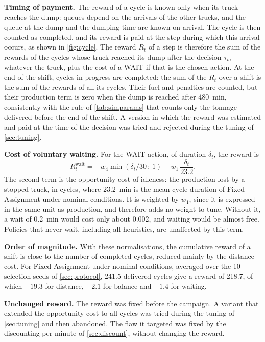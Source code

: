 \documentclass[11pt,a4paper]{article}
\newif\ifrevmarks
\newcommand{\revtag}[1]{\ifrevmarks\textsuperscript{\textcolor{red!70!black}{\scriptsize[#1]}}\fi}
\newenvironment{revbloc}[1]{\par\ifrevmarks\color{revcolor}\noindent\revtag{#1}\ \fi}{\par}
\newif\ifcorrmarks
\newcommand{\corr}[1]{\ifcorrmarks\textcolor{corrcolor}{#1}\else#1\fi}
\begin{document}
\begin{revbloc}{M10, M16, v3}
\textbf{Timing of payment.} \corr{The reward of a cycle is known only when its truck reaches the dump: queues depend on the arrivals of the other trucks, and the queue at the dump and the dumping time are known on arrival. The cycle is then counted as completed, and its reward is paid at the step during which this arrival occurs, as shown in \cref{fig:cycle}. The reward $R_t$ of a step is therefore the sum of the rewards of the cycles whose truck reached its dump after the decision $\tau_t$,} whatever the truck, plus the cost of a WAIT if that is the chosen action. At the end of the shift, cycles in progress are completed: the sum of the $R_t$ over a shift is the sum of the rewards of all its cycles. \corr{Their fuel and penalties are counted, but their production term is zero when the dump is reached after 480~min, consistently with the rule of \cref{tab:simparams} that counts only the tonnage delivered before the end of the shift.} A version in which the reward was estimated and paid at the time of the decision was tried and rejected during the tuning of \cref{sec:tuning}.

\textbf{Cost of voluntary waiting.} For the WAIT action, of duration $\delta_t$, the reward is
\begin{equation}
R^{\mathrm{wait}}_t = - w_4 \min(\delta_t/30\,;\,1) - w_1\, \frac{\delta_t}{23.2} .
\label{eq:wait-reward}
\end{equation}
The second term is the opportunity cost of idleness: the production lost by a stopped truck, in cycles, where 23.2~min is the mean cycle duration of Fixed Assignment under nominal conditions. It is weighted by $w_1$, since it is expressed in the same unit as production, and therefore adds no weight to tune. Without it, a wait of 0.2~min would cost only about 0.002, and waiting would be almost free. Policies that never wait, including all heuristics, are unaffected by this term.

\textbf{Order of magnitude.} With these normalisations, the cumulative reward of a shift is close to the number of completed cycles, reduced mainly by the distance cost. For Fixed Assignment under nominal conditions, averaged over the 10 selection seeds of \cref{sec:protocol}, 241.5 delivered cycles give a reward of 218.7, of which $-19.3$ for distance, $-2.1$ for balance and $-1.4$ for waiting.

\textbf{Unchanged reward.} The reward was fixed before the campaign. A variant that extended the opportunity cost to all cycles was tried during the tuning of \cref{sec:tuning} and then abandoned. The flaw it targeted was fixed by the discounting per minute of \cref{sec:discount}, without changing the reward.
\end{revbloc}
\end{document}
